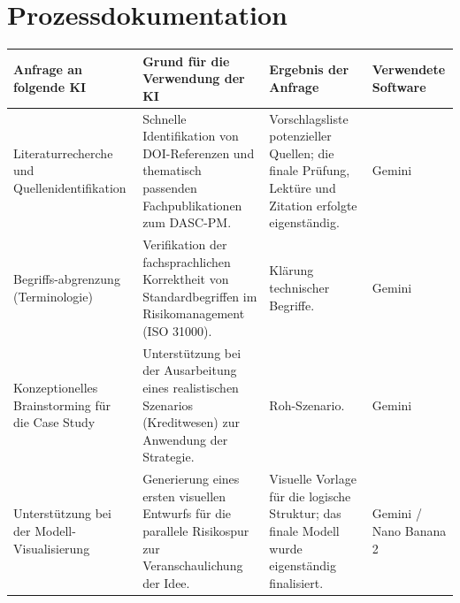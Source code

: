 \section{Prozessdokumentation}
\begin{center}

\begin{tabular}{|p{3cm}|p{4.9cm}|p{3cm}|p{4.9cm}|}
    \hline
    \textbf{Anfrage an folgende KI} & \textbf{Grund für die Verwendung der KI} & \textbf{Ergebnis der Anfrage} & \textbf{Verwendete Software} \\
    \hline
    Literaturrecherche und Quellenidentifikation & Schnelle Identifikation von DOI-Referenzen und thematisch passenden Fachpublikationen zum DASC-PM. & Vorschlagsliste potenzieller Quellen; die finale Prüfung, Lektüre und Zitation erfolgte eigenständig. & Gemini \\
    \hline
    Begriffs-abgrenzung (Terminologie) & Verifikation der fachsprachlichen Korrektheit von Standardbegriffen im Risikomanagement (ISO 31000). & Klärung technischer Begriffe. & Gemini \\
    \hline
    Konzeptionelles Brainstorming für die Case Study & Unterstützung bei der Ausarbeitung eines realistischen Szenarios (Kreditwesen) zur Anwendung der Strategie. & Roh-Szenario. & Gemini \\
    \hline
    Unterstützung bei der Modell-Visualisierung & Generierung eines ersten visuellen Entwurfs für die parallele Risikospur zur Veranschaulichung der Idee. & Visuelle Vorlage für die logische Struktur; das finale Modell wurde eigenständig finalisiert. & Gemini / Nano Banana 2 \\
    \hline
\end{tabular}

\end{center}

